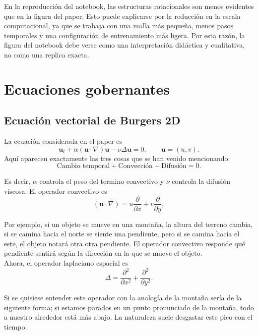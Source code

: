 \documentclass[10pt,letterpaper,twocolumn]{article}
\begin{document}
En la reproducción del notebook, las estructuras rotacionales son menos evidentes que en la figura del paper. Esto puede explicarse por la reducción en la escala computacional, ya que se trabaja con una malla más pequeña, menos pasos temporales y una configuración de entrenamiento más ligera. Por esta razón, la figura del notebook debe verse como una interpretación didáctica y cualitativa, no como una replica exacta.

\section{Ecuaciones gobernantes}

\subsection{Ecuación vectorial de Burgers 2D}

La ecuación considerada en el paper es
\begin{equation}
    \mathbf{u}_t+\alpha(\mathbf{u}\cdot\nabla)\mathbf{u}-\nu\Delta\mathbf{u}=0,
    \qquad \mathbf{u}=(u,v).
    \label{eq:burgers_vectorial}
\end{equation}
Aquí aparecen exactamente las tres cosas que se han venido mencionando: 
$$\text{Cambio temporal} + \text{Convección} + \text{Difusión} = 0.$$

Es decir, $\alpha$ controla el peso del termino convectivo y $\nu$ controla la difusión viscosa. El operador convectivo es
\begin{equation}
    (\mathbf{u}\cdot\nabla)=u\frac{\partial}{\partial x}+v\frac{\partial}{\partial y},
\end{equation}

Por ejemplo, si un objeto se mueve en una montaña, la altura del terreno cambia, si se camina hacia el norte se siente una pendiente, pero si se camina hacia el este, el objeto notará otra otra pendiente. El operador convectivo responde qué pendiente sentirá según la dirección en la que se mueve el objeto.\\

Ahora, el operador laplaciano espacial es
\begin{equation}
    \Delta = \frac{\partial^2}{\partial x^2}+\frac{\partial^2}{\partial y^2}.
\end{equation}

Si se quisiese entender este operador con la analogía de la montaña sería de la siguiente forma; si estamos parados en un punto pronunciado de la montaña, todo a nuestro alrededor está más abajo. La naturaleza suele desgastar este pico con el tiempo.
\end{document}
